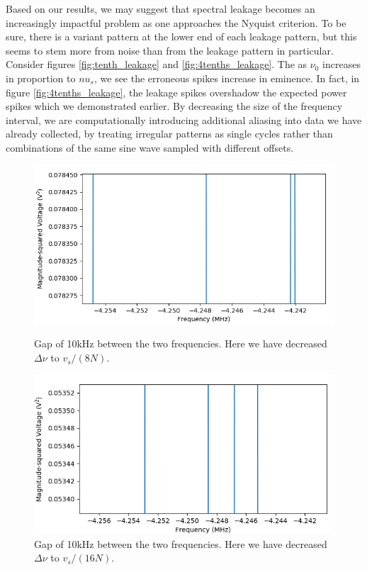 \documentclass[a4paper]{article}
\begin{document}
Based on our results, we may suggest that spectral leakage becomes an increasingly impactful problem as one approaches the Nyquist criterion. To be sure, there is a variant pattern at the lower end of each leakage pattern, but this seems to stem more from noise than from the leakage pattern in particular. Consider figures \ref{fig:tenth_leakage} and \ref{fig:4tenths_leakage}. The as $\nu_0$ increases in proportion to $nu_s$, we see the erroneous spikes increase in eminence. In fact, in figure \ref{fig:4tenths_leakage}, the leakage spikes overshadow the expected power spikes which we demonstrated earlier. By decreasing the size of the frequency interval, we are computationally introducing additional aliasing into data we have already collected, by treating irregular patterns as single cycles rather than combinations of the same sine wave sampled with different offsets.




\begin{figure}
\centering
\begin{minipage}{.5\textwidth}
	\centering
	\includegraphics[width=.9\linewidth]{5-5/10k_factor8}
	\caption{Gap of 10kHz between the \hfill \break two frequencies. Here we have decreased \hfill \break $\Delta \nu$ to $v_s / (8N)$.}
	\label{fig:10kf8}
\end{minipage}%
\begin{minipage}{.5\textwidth}
	\centering
	\includegraphics[width=.9\linewidth]{5-5/5k_factor16}
	\caption{Gap of 10kHz between the two frequencies. Here we have decreased $\Delta \nu$ to $v_s / (16N)$.}
	\label{fig:5kf16}
\end{minipage}
\end{figure}
\end{document}
